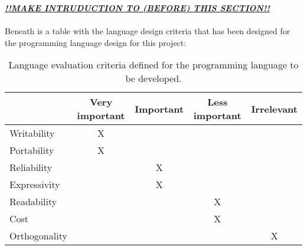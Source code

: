 \textbf{\textit{\underline{!!MAKE INTRUDUCTION TO (BEFORE) THIS SECTION!!}}}
\\ \\
Beneath is a table with the language design criteria that has been designed for the programming language design for this project:
\begin{table}[htbp]
\centering
\begin{tabular}{|l|c|c|c|c|}
\hline
& Very important & Important & Less important & Irrelevant \\ \hline
Writability & X & & & \\ \hline
Portability & X & & & \\ \hline
Reliability & & X & & \\ \hline
Expressivity & & X & & \\ \hline
Readability & & & X & \\ \hline
Cost & & & X & \\ \hline
Orthogonality & & & & X \\ \hline


\end{tabular}
\caption{Language evaluation criteria defined for the programming language to be developed.}
\label{tbl:evaluation criteria}
\end{table}